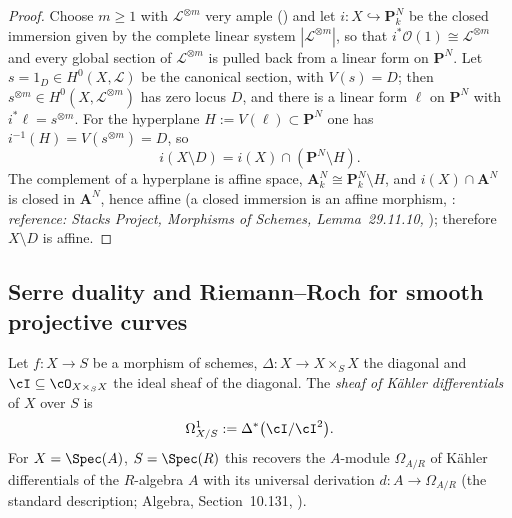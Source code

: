 \begin{proof}
Choose \(m\geq1\) with \(\mathcal L^{\otimes m}\) very ample
() and let \(i:X\hookrightarrow\mathbf P^N_k\) be
the closed immersion given by the complete linear system
\(|\mathcal L^{\otimes m}|\), so that
\(i^*\mathcal O(1)\cong\mathcal L^{\otimes m}\) and every global
section of \(\mathcal L^{\otimes m}\) is pulled back from a linear
form on \(\mathbf P^N\).  Let \(s=1_D\in H^0(X,\mathcal L)\) be the
canonical section, with \(V(s)=D\); then
\(s^{\otimes m}\in H^0(X,\mathcal L^{\otimes m})\) has zero locus
\(D\), and there is a linear form \(\ell\) on \(\mathbf P^N\) with
\(i^*\ell=s^{\otimes m}\).  For the hyperplane
\(H:=V(\ell)\subset\mathbf P^N\) one has
\(i^{-1}(H)=V(s^{\otimes m})=D\), so
\[
 i(X\setminus D)=i(X)\cap(\mathbf P^N\setminus H).
\]
The complement of a hyperplane is affine space,
\(\mathbf A^N_k\cong\mathbf P^N_k\setminus H\), and
\(i(X)\cap\mathbf A^N\) is closed in \(\mathbf A^N\), hence affine
(a closed immersion is an affine morphism,
: \emph{reference: Stacks
Project, Morphisms of Schemes, Lemma~29.11.10,
}); therefore \(X\setminus D\) is affine.
\end{proof}
\subsection{Serre duality and Riemann--Roch for smooth projective curves}

\begin{definition}
\label{def:pc-kahler-differentials}
Let $f:X\to S$ be a morphism of schemes, $\Delta:X\to X\times_SX$ the
diagonal and $\cI\subseteq\cO_{X\times_SX}$ the ideal sheaf of the
diagonal.  The \emph{sheaf of Kähler differentials} of $X$ over $S$ is
\[
\Omega^1_{X/S}:=\Delta^*\bigl(\cI/\cI^2\bigr).
\]
For $X=\Spec(A)$, $S=\Spec(R)$ this recovers the $A$-module
$\Omega_{A/R}$ of Kähler differentials of the $R$-algebra $A$ with its
universal derivation $d:A\to\Omega_{A/R}$ (the standard description;
Algebra, Section~10.131,
).
\end{definition}

